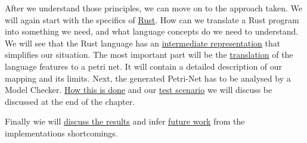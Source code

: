 After we understand those principles, we can move on to the approach taken.
We will again start with the specifics of \hyperlink{app_rust}{Rust}.
How can we translate a Rust program into something we need,
and what language concepts do we need to understand.
We will see that the Rust language has an \hyperlink{app_mir}{intermediate representation} that simplifies our situation.
The most important part will be the \hyperlink{app_trans}{translation} of the language features to a petri net.
It will contain a detailed description of our mapping and its limits.
Next, the generated Petri-Net has to be analysed by a Model Checker. 
\hyperlink{app_mc}{How this is done} and our \hyperlink{app_test}{test scenario} we will discuss be discussed at the end of the chapter.

Finally wie will \hyperlink{results}{discuss the results} and infer \hyperlink{future}{future work} from the implementations shortcomings.
